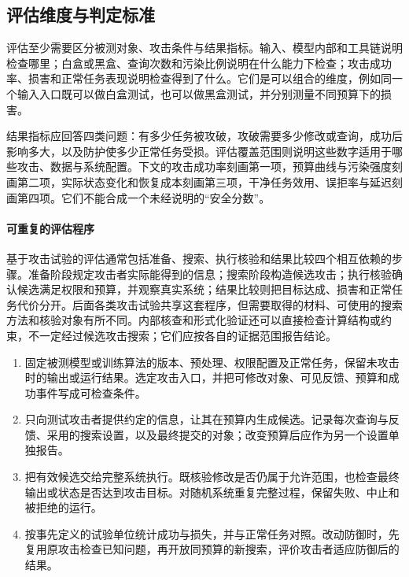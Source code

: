 \subsection{评估维度与判定标准}
\label{sec:security-risk-assessment}

评估至少需要区分被测对象、攻击条件与结果指标。输入、模型内部和工具链说明检查哪里；白盒或黑盒、查询次数和污染比例说明在什么能力下检查；攻击成功率、损害和正常任务表现说明检查得到了什么。它们是可以组合的维度，例如同一个输入入口既可以做白盒测试，也可以做黑盒测试，并分别测量不同预算下的损害。

结果指标应回答四类问题：有多少任务被攻破，攻破需要多少修改或查询，成功后影响多大，以及防护使多少正常任务受损。评估覆盖范围则说明这些数字适用于哪些攻击、数据与系统配置。下文的攻击成功率刻画第一项，预算曲线与污染强度刻画第二项，实际状态变化和恢复成本刻画第三项，干净任务效用、误拒率与延迟刻画第四项。它们不能合成一个未经说明的“安全分数”。

\paragraph{可重复的评估程序}

基于攻击试验的评估通常包括准备、搜索、执行核验和结果比较四个相互依赖的步骤。准备阶段规定攻击者实际能得到的信息；搜索阶段构造候选攻击；执行核验确认候选满足权限和预算，并观察真实系统；结果比较则把目标达成、损害和正常任务代价分开。后面各类攻击试验共享这套程序，但需要取得的材料、可使用的搜索方法和核验对象有所不同。内部核查和形式化验证还可以直接检查计算结构或约束，不一定经过候选攻击搜索；它们应按各自的证据范围报告结论。

\begin{enumerate}
 \item 固定被测模型或训练算法的版本、预处理、权限配置及正常任务，保留未攻击时的输出或运行结果。选定攻击入口，并把可修改对象、可见反馈、预算和成功事件写成可检查条件。
 \item 只向测试攻击者提供约定的信息，让其在预算内生成候选。记录每次查询与反馈、采用的搜索设置，以及最终提交的对象；改变预算后应作为另一个设置单独报告。
 \item 把有效候选交给完整系统执行。既核验修改是否仍属于允许范围，也检查最终输出或状态是否达到攻击目标。对随机系统重复完整过程，保留失败、中止和被拒绝的运行。
 \item 按事先定义的试验单位统计成功与损失，并与正常任务对照。改动防御时，先复用原攻击检查已知问题，再开放同预算的新搜索，评价攻击者适应防御后的结果。
\end{enumerate}

